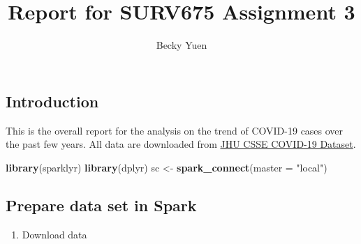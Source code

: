 \documentclass[
]{article}
\title{Report for SURV675 Assignment 3}
\author{Becky Yuen}
\date{}
\newenvironment{Shaded}{\begin{snugshade}}{\end{snugshade}}
\newcommand{\AttributeTok}[1]{\textcolor[rgb]{0.13,0.29,0.53}{#1}}
\newcommand{\FunctionTok}[1]{\textcolor[rgb]{0.13,0.29,0.53}{\textbf{#1}}}
\newcommand{\NormalTok}[1]{#1}
\newcommand{\OtherTok}[1]{\textcolor[rgb]{0.56,0.35,0.01}{#1}}
\newcommand{\StringTok}[1]{\textcolor[rgb]{0.31,0.60,0.02}{#1}}
\providecommand{\tightlist}{%
  \setlength{\itemsep}{0pt}\setlength{\parskip}{0pt}}
\begin{document}
\maketitle

\hypertarget{introduction}{%
\subsection{Introduction}\label{introduction}}

This is the overall report for the analysis on the trend of COVID-19
cases over the past few years. All data are downloaded from
\href{https://github.com/CSSEGISandData/COVID-19/tree/master/csse_covid_19_data}{JHU
CSSE COVID-19 Dataset}.

\begin{Shaded}
\begin{Highlighting}[]
\FunctionTok{library}\NormalTok{(sparklyr)}
\FunctionTok{library}\NormalTok{(dplyr)}
\NormalTok{sc }\OtherTok{\textless{}{-}} \FunctionTok{spark\_connect}\NormalTok{(}\AttributeTok{master =} \StringTok{"local"}\NormalTok{)}
\end{Highlighting}
\end{Shaded}

\hypertarget{prepare-data-set-in-spark}{%
\subsection{Prepare data set in Spark}\label{prepare-data-set-in-spark}}

\begin{enumerate}
\def\labelenumi{\arabic{enumi}.}
\tightlist
\item
  Download data
\end{enumerate}
\end{document}

